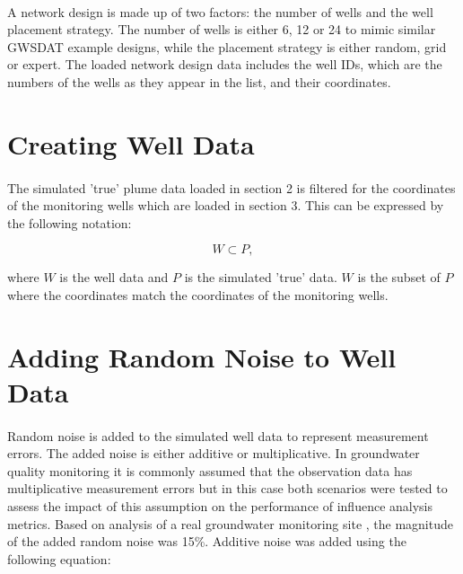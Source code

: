 \documentclass{article}
\begin{document}
\paragraph{}

A network design is made up of two factors: the number of wells and the well placement strategy. The number of wells is either 6, 12 or 24 to mimic similar GWSDAT example designs, while the placement strategy is either random, grid or expert. The loaded network design data includes the well IDs, which are the numbers of the wells as they appear in the list, and their coordinates.

\section{Creating Well Data}
\paragraph{}

The simulated 'true' plume data loaded in section 2 is filtered for the coordinates of the monitoring wells which are loaded in section 3. This can be expressed by the following notation:

\begin{equation}
    W \subset P,
\end{equation}

where $W$ is the well data and $P$ is the simulated 'true' data. $W$ is the subset of $P$ where the coordinates match the coordinates of the monitoring wells.

\section{Adding Random Noise to Well Data}
\paragraph{}

Random noise is added to the simulated well data to represent measurement errors. The added noise is either additive or multiplicative. In groundwater quality monitoring it is commonly assumed that the observation data has multiplicative measurement errors but in this case both scenarios were tested to assess the impact of this assumption on the performance of influence analysis metrics. Based on analysis of a real groundwater monitoring site \parencite[]{mclean2019}, the magnitude of the added random noise was 15\%. Additive noise was added using the following equation:
\end{document}
